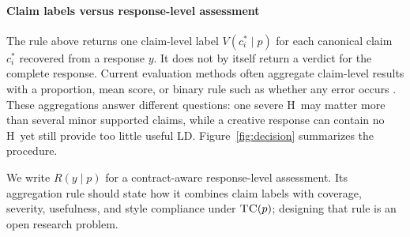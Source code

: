 \documentclass{clv2025}
\newcommand{\TC}{\textsc{TC}}
\newcommand{\LD}{\textsc{LD}}
\newcommand{\Hall}{\textsc{H}}
\begin{document}
\paragraph{Claim labels versus response-level assessment}
The rule above returns one claim-level label $V(c_i^*\mid p)$ for each canonical claim $c_i^*$ recovered from a response $y$.
It does not by itself return a verdict for the complete response.
Current evaluation methods often aggregate claim-level results with a proportion, mean score, or binary rule such as whether any error occurs \citep{min_factscore_2023,bayat_factbench_2024}.
These aggregations answer different questions: one severe \Hall\ may matter more than several minor supported claims, while a creative response can contain no \Hall\ yet still provide too little useful \LD.
Figure~\ref{fig:decision} summarizes the procedure.

We write $R(y\mid p)$ for a contract-aware response-level assessment.
Its aggregation rule should state how it combines claim labels with coverage, severity, usefulness, and style compliance under $\TC(p)$; designing that rule is an open research problem.
\end{document}
